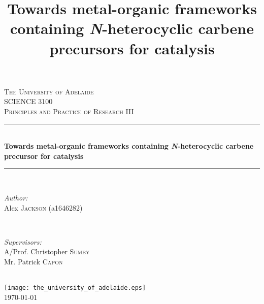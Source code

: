 \documentclass[12pt,a4paper]{article}
\title{Towards metal-organic frameworks containing \emph{N}-heterocyclic carbene precursors for catalysis}
\newcommand{\HRule}{\rule{\linewidth}{0.5mm}} %
\begin{document}
\begin{titlepage}
	
	\center %

	\textsc{\Large The University of Adelaide}\\[2cm] %
	\textsc{\LARGE SCIENCE 3100}\\[1cm] %
	\textsc{\LARGE Principles and Practice of Research III}\\[1.5cm] %


	\HRule \\[0.4cm]
	{ \huge \bfseries Towards metal-organic frameworks containing \emph{N}-heterocyclic carbene precursor for catalysis}\\[0.4cm] %
	\HRule \\[1.5cm]

	
	\begin{minipage}{0.50\textwidth}
		\begin{flushleft} \large
			\emph{Author:}\\
            Alex \textsc{Jackson} (a1646282)
		\end{flushleft}
	\end{minipage}
	~
	\begin{minipage}{0.45\textwidth}
		\begin{flushright} \large
			\emph{Supervisors:} \\
			A/Prof. Christopher \textsc{Sumby}\\ %
                        Mr. Patrick \textsc{Capon}
		\end{flushright}
	\end{minipage}\\[1cm]
	
	\texttt{[image: the\_university\_of\_adelaide.eps]}\\[1.5cm]
	{\large \today}\\[1cm] %
	\vfill %
	
\end{titlepage}

\thispagestyle{plain}
\end{document}
